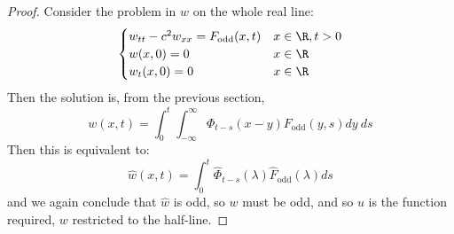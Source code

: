 \documentclass[../Main.tex]{subfiles}
\begin{document}
\begin{proof}
    Consider the problem in $w$ on the whole real line:
    \begin{equation*}
        \begin{cases}
            w_{tt} - c^2 w_{xx} = F_{\text{odd}}(x, t) & x \in \R, t > 0 \\
            w(x, 0) = 0 & x \in \R \\
            w_t(x, 0) = 0 & x \in \R
        \end{cases}
    \end{equation*}
    Then the solution is, from the previous section,
    \begin{equation*}
        w(x, t) = \int_{0}^{t} \int_{-\infty}^{\infty} \Phi_{t - s}(x - y) F_{\text{odd}}(y, s) dy~ds 
    \end{equation*}
    Then this is equivalent to:
    \begin{equation*}
        \hat{w}(x, t) = \int_{0}^{t} \hat{\Phi}_{t - s}(\lambda) \hat{F}_{\text{odd}}(\lambda) ds
    \end{equation*}
    and we again conclude that $\hat{w}$ is odd, so $w$ must be odd, and so $u$ is the function required, $w$ restricted to the half-line.
\end{proof}
\end{document}
